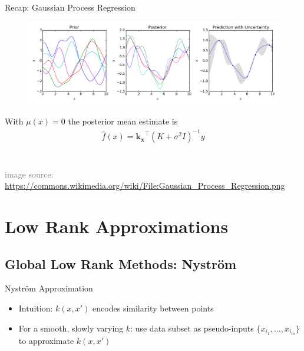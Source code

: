 \documentclass{beamer}
\begin{document}
\begin{frame}{Recap: Gaussian Process Regression}
\begin{figure}
    \centering
     \includegraphics[scale=0.35]{figs/Gaussian_Process_Regression.png}
\end{figure}
With $\mu(x)=0$ the posterior mean estimate is
\begin{align*}
    \hat{f}(x)=\mathbf{k_x}^\top(K+\sigma^2I)^{-1}y
\end{align*}
\\\\
\tiny\textcolor{gray}{image source: \url{https://commons.wikimedia.org/wiki/File:Gaussian_Process_Regression.png}}

\end{frame}
\section{Low Rank Approximations}

\subsection{Global Low Rank Methods: Nystr\"om}

\begin{frame}{Nystr\"om Approximation}
    \begin{itemize}
        \item Intuition: $k(x,x')$ encodes similarity between points
        \item For a smooth, slowly varying $k$: use data subset as pseudo-inputs 
            $\{x_{i_1},...,x_{i_m}\}$ to approximate $k(x,x')$
    \end{itemize}
\end{frame}
\end{document}

